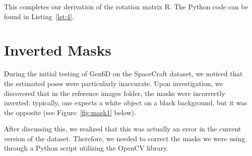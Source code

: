 \bigskip

\noindent This completes our derivation of the rotation matrix $\bm{\mathrm{R}}$. The Python code can be found in Listing~\ref{lst:4}.

\section{Inverted Masks}

During the initial testing of Gen6D on the SpaceCraft dataset, we noticed that the estimated poses were particularly inaccurate. Upon investigation, we discovered that in the reference images folder, the masks were incorrectly inverted: typically, one expects a white object on a black background, but it was the opposite (see Figure~\ref{fig:mask1} below).

After discussing this, we realized that this was actually an error in the current version of the dataset. Therefore, we needed to correct the masks we were using through a Python script utilizing the OpenCV library. 

